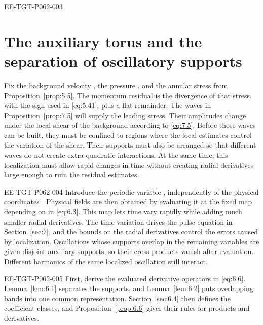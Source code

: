 \begin{EESegment}{EE-TGT-P062-003}
\section{The auxiliary torus and the separation of oscillatory supports}\label{sec:6}

Fix the background velocity , the pressure , and the annular stress  from Proposition~\ref{prop:5.5}. The momentum residual is the divergence of that stress, with the sign used in \eqref{eq:5.41}, plus a flat remainder. The waves in Proposition~\ref{prop:7.5} will supply the leading stress. Their amplitudes change under the local shear of the background according to \eqref{eq:7.5}. Before those waves can be built, they must be confined to regions where the local estimates control the variation of the shear. Their supports must also be arranged so that different waves do not create extra quadratic interactions. At the same time, this localization must allow rapid changes in time without creating radial derivatives large enough to ruin the residual estimates.
\end{EESegment}

\begin{EESegment}{EE-TGT-P062-004}
Introduce the periodic variable , independently of the physical coordinates . Physical fields are then obtained by evaluating it at the fixed map depending on  in \eqref{eq:6.3}. This map lets time vary rapidly while adding much smaller radial derivatives. The time variation drives the pulse equation in Section~\ref{sec:7}, and the bounds on the radial derivatives control the errors caused by localization. Oscillations whose supports overlap in the remaining variables are given disjoint auxiliary supports, so their cross products vanish after evaluation. Different harmonics of the same localized oscillation still interact.
\end{EESegment}

\begin{EESegment}{EE-TGT-P062-005}
First, derive the evaluated derivative operators in \eqref{eq:6.6}. Lemma~\ref{lem:6.1} separates the supports, and Lemma~\ref{lem:6.2} puts overlapping bands into one common representation. Section~\ref{sec:6.4} then defines the coefficient classes, and Proposition~\ref{prop:6.6} gives their rules for products and derivatives.
\end{EESegment}

